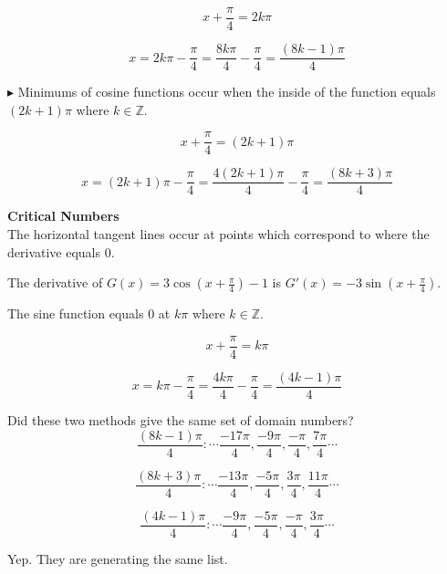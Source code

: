 \documentclass{ximera}
\begin{document}
\begin{example}
\begin{explanation}
\[
x + \frac{\pi}{4} = 2 k \pi
\]

\[
x = 2 k \pi - \frac{\pi}{4} = \frac{8 k \pi}{4} - \frac{\pi}{4} = \frac{(8k - 1)\pi}{4}
\]




$\blacktriangleright$ Minimums of cosine functions occur when the inside of the function equals $(2 k + 1) \pi$ where $k \in \mathbb{Z}$.


\[
x + \frac{\pi}{4} = (2 k + 1) \pi
\]

\[
x = (2 k + 1) \pi - \frac{\pi}{4} = \frac{4(2 k + 1) \pi}{4} - \frac{\pi}{4} = \frac{(8k + 3)\pi}{4}
\]


\end{explanation}








\begin{explanation} \textbf{\textcolor{blue!55!black}{Critical Numbers}} \\


The horizontal tangent lines occur at points which correspond to where the derivative equals $0$.  






The derivative of $G(x) = 3 \cos\left( x + \frac{\pi}{4} \right) - 1$ is $G'(x) = -3 \sin\left( x + \frac{\pi}{4} \right)$.


The sine function equals $0$ at $k \pi$ where $k \in \mathbb{Z}$.



\[
x + \frac{\pi}{4} =  k \pi
\]


\[
x  =    k \pi - \frac{\pi}{4} =  \frac{4 k \pi}{4} - \frac{\pi}{4} = \frac{(4k - 1)\pi}{4}
\]









\end{explanation}



Did these two methods give the same set of domain numbers? \\



\[
\frac{(8k - 1)\pi}{4} :  \cdots \frac{-17\pi}{4}, \frac{-9\pi}{4}, \frac{-\pi}{4}, \frac{7\pi}{4} \cdots
\]

\[
\frac{(8k + 3)\pi}{4} :  \cdots \frac{-13\pi}{4}, \frac{-5\pi}{4}, \frac{3\pi}{4}, \frac{11\pi}{4} \cdots
\]


\[
\frac{(4k - 1)\pi}{4} :  \cdots \frac{-9\pi}{4}, \frac{-5\pi}{4}, \frac{-\pi}{4}, \frac{3\pi}{4} \cdots
\]



Yep.  They are generating the same list.


\end{example}
\end{document}
